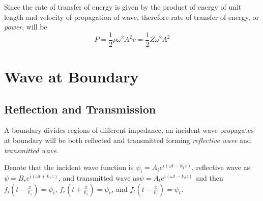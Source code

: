\documentclass[openany]{book}
\begin{document}
Since the rate of transfer of energy is given by the product of energy of unit length and velocity of propagation of wave, therefore rate of transfer of energy, or \emph{power}, will be
\[P=\frac{1}{2}\rho \omega ^2A^2v=\frac{1}{2}Z\omega ^2A^2\]
\section{Wave at Boundary}
\subsection{Reflection and Transmission}
A boundary divides regions of different impedance, an incident wave propagates at boundary will be both reflected and transmitted forming \emph{reflective wave} and \emph{transmitted wave}.

Denote that the incident wave function is $\psi _i=A_ie^{i(\omega t-k_1z)}$, reflective wave as $\psi =B_re^{i(\omega t+k_1z)}$, and transmitted wave as$\psi =A_te^{i(\omega t-k_2z)}$ and then $f_i(t-\frac{x}{v_1})=\psi _i$, $f_r(t+\frac{x}{v_1})=\psi _r$, and $f_t(t-\frac{x}{v_1})=\psi _t$.
\end{document}
